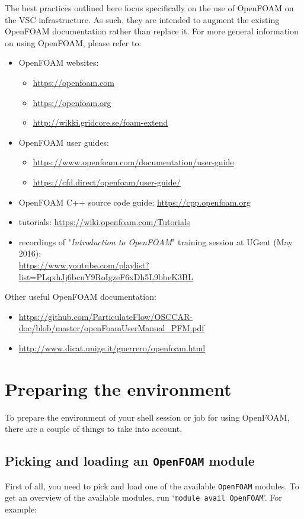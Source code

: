 The best practices outlined here focus specifically on the use of OpenFOAM on the VSC \hpc infrastructure.
As such, they are intended to augment the existing OpenFOAM documentation rather than replace it.
For more general information on using OpenFOAM, please refer to:
\begin{itemize}
\item OpenFOAM websites:
\begin{itemize}
    \item \url{https://openfoam.com}
    \item \url{https://openfoam.org}
    \item \url{http://wikki.gridcore.se/foam-extend}
\end{itemize}
\item OpenFOAM user guides:
    \begin{itemize}
    \item \url{https://www.openfoam.com/documentation/user-guide}
    \item \url{https://cfd.direct/openfoam/user-guide/}
    \end{itemize}
\item OpenFOAM C++ source code guide: \url{https://cpp.openfoam.org}
\item tutorials: \url{https://wiki.openfoam.com/Tutorials}
\item recordings of "\emph{Introduction to OpenFOAM}" training session at UGent (May 2016):\\
      \small{\url{https://www.youtube.com/playlist?list=PLqxhJj6bcnY9RoIgzeF6xDh5L9bbeK3BL}}
\end{itemize}
Other useful OpenFOAM documentation:
\begin{itemize}
\item {\small\url{https://github.com/ParticulateFlow/OSCCAR-doc/blob/master/openFoamUserManual_PFM.pdf}}
\item \url{http://www.dicat.unige.it/guerrero/openfoam.html}
\end{itemize}

\section{Preparing the environment}
\label{sec:best-practices-openfoam-environment}

To prepare the environment of your shell session or job for using OpenFOAM,
there are a couple of things to take into account.

\subsection{Picking and loading an \texttt{OpenFOAM} module}
First of all, you need to pick and load one of the available \lstinline|OpenFOAM| modules.
To get an overview of the available modules, run `\lstinline|module avail OpenFOAM|'. For example:

